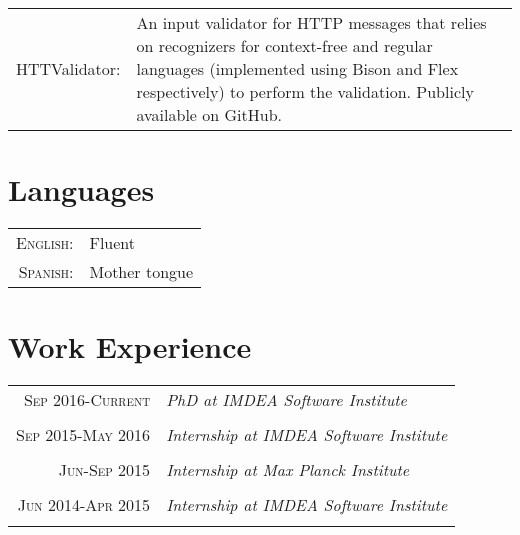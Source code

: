 \documentclass[a4paper,10pt]{article} %
\begin{document}
\begin{tabular}{rp{11cm}}
HTTValidator: & An input validator for HTTP messages that relies on recognizers for context-free and regular languages (implemented using Bison and Flex respectively) to perform the validation. Publicly available on GitHub. \\
\end{tabular}


\section{Languages}

\begin{tabular}{rl}
\textsc{English:} & Fluent\\

\textsc{Spanish:} & Mother tongue\\

\end{tabular}


\section{Work Experience}

\begin{tabular}{r|p{11cm}}
\textsc{Sep 2016-Current} & \emph{PhD at IMDEA Software Institute}\\
\multicolumn{2}{c}{} \\

\textsc{Sep 2015-May 2016} & \emph{Internship at IMDEA Software Institute}\\
\multicolumn{2}{c}{} \\

\textsc{Jun-Sep 2015} & \emph{Internship at Max Planck Institute}\\
\multicolumn{2}{c}{} \\

\textsc{Jun 2014-Apr 2015} & \emph{Internship at IMDEA Software Institute}\\
\multicolumn{2}{c}{} \\
\end{tabular}
\end{document}

